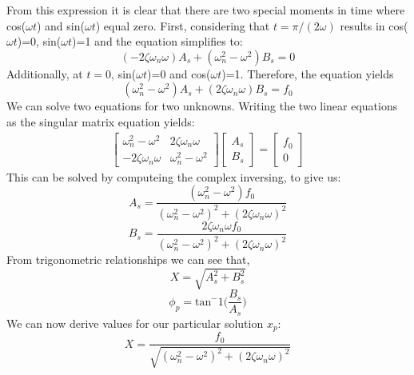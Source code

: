 \documentclass[12pt,letter]{article}
\numberwithin{ex}{section} %
\numberwithin{re}{section} %
\begin{document}
			From this expression it is clear that there are two special moments in time where cos($\omega t$) and sin($\omega t$) equal zero. First, considering that $t=\pi/(2\omega)$ results in cos($\omega t$)=0, sin($\omega t$)=1 and the equation simplifies to:
			\begin{equation}
				(-2\zeta \omega_n \omega)A_s + (\omega_n^2 - \omega^2)B_s = 0
			\end{equation}	
			Additionally, at $t=0$, sin($\omega t$)=0 and cos($\omega t$)=1. Therefore, the equation yields		
			\begin{equation}
				(\omega_n^2 - \omega^2)A_s + (2\zeta \omega_n \omega)B_s = f_0
			\end{equation}				
			We can solve two equations for two unknowns. Writing the two linear equations as the singular matrix equation yields:
			\begin{gather}
			   \begin{bmatrix}
			   \omega_n^2 - \omega^2 & 2\zeta \omega_n \omega \\
			   - 2\zeta \omega_n \omega &  \omega_n^2 - \omega^2
			   \end{bmatrix}
  			   \begin{bmatrix}
  			   A_s \\
  			   B_s
  			   \end{bmatrix}
			 = \begin{bmatrix} f_0 \\ 0
			 \end{bmatrix}
			\end{gather}
			This can be solved by computeing the complex inversing, to give us:
			\begin{equation}
				A_s = \frac{(\omega_n^2 - \omega^2)f_0}{(\omega_n^2 - \omega^2)^2 +  (2\zeta \omega_n \omega)^2}
			\end{equation}	
			\begin{equation}
				B_s = \frac{2\zeta \omega_n \omega f_0}{(\omega_n^2 - \omega^2)^2 +  (2\zeta \omega_n \omega)^2}
			\end{equation}	
			From trigonometric relationships we can see that, 
			\begin{equation}
				X = \sqrt{A_s^2 + B_s^2}
			\end{equation}	
			\begin{equation}
				\phi_p = \text{tan}^-1\bigg(\frac{B_s}{A_s}\bigg)
			\end{equation}	
			We can now derive values for our particular solution $x_p$:
			\begin{equation}
				X = \frac{f_0}{\sqrt{(\omega_n^2 - \omega^2)^2 +  (2\zeta \omega_n \omega)^2}} 
				\label{eq:X_damped}
			\end{equation}	
\end{document}
